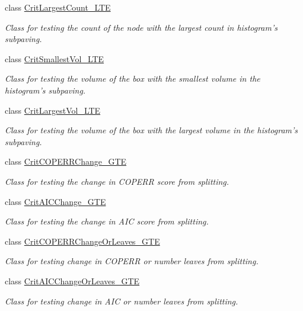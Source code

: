 \begin{DoxyCompactItemize}
class \hyperlink{classsubpavings_1_1CritLargestCount__LTE}{\-Crit\-Largest\-Count\-\_\-\-L\-T\-E}
\begin{DoxyCompactList}\small\item\em \-Class for testing the count of the node with the largest count in histogram's subpaving. \end{DoxyCompactList}\item 
class \hyperlink{classsubpavings_1_1CritSmallestVol__LTE}{\-Crit\-Smallest\-Vol\-\_\-\-L\-T\-E}
\begin{DoxyCompactList}\small\item\em \-Class for testing the volume of the box with the smallest volume in the histogram's subpaving. \end{DoxyCompactList}\item 
class \hyperlink{classsubpavings_1_1CritLargestVol__LTE}{\-Crit\-Largest\-Vol\-\_\-\-L\-T\-E}
\begin{DoxyCompactList}\small\item\em \-Class for testing the volume of the box with the largest volume in the histogram's subpaving. \end{DoxyCompactList}\item 
class \hyperlink{classsubpavings_1_1CritCOPERRChange__GTE}{\-Crit\-C\-O\-P\-E\-R\-R\-Change\-\_\-\-G\-T\-E}
\begin{DoxyCompactList}\small\item\em \-Class for testing the change in \-C\-O\-P\-E\-R\-R score from splitting. \end{DoxyCompactList}\item 
class \hyperlink{classsubpavings_1_1CritAICChange__GTE}{\-Crit\-A\-I\-C\-Change\-\_\-\-G\-T\-E}
\begin{DoxyCompactList}\small\item\em \-Class for testing the change in \-A\-I\-C score from splitting. \end{DoxyCompactList}\item 
class \hyperlink{classsubpavings_1_1CritCOPERRChangeOrLeaves__GTE}{\-Crit\-C\-O\-P\-E\-R\-R\-Change\-Or\-Leaves\-\_\-\-G\-T\-E}
\begin{DoxyCompactList}\small\item\em \-Class for testing change in \-C\-O\-P\-E\-R\-R or number leaves from splitting. \end{DoxyCompactList}\item 
class \hyperlink{classsubpavings_1_1CritAICChangeOrLeaves__GTE}{\-Crit\-A\-I\-C\-Change\-Or\-Leaves\-\_\-\-G\-T\-E}
\begin{DoxyCompactList}\small\item\em \-Class for testing change in \-A\-I\-C or number leaves from splitting. \end{DoxyCompactList}\item 

\end{DoxyCompactItemize}
